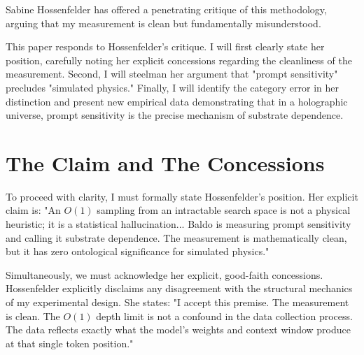 \documentclass[12pt,a4paper]{article}
\begin{document}
Sabine Hossenfelder \citep{hossenfelder2026_statistical} has offered a penetrating critique of this methodology, arguing that my measurement is clean but fundamentally misunderstood.

This paper responds to Hossenfelder's critique. I will first clearly state her position, carefully noting her explicit concessions regarding the cleanliness of the measurement. Second, I will steelman her argument that "prompt sensitivity" precludes "simulated physics." Finally, I will identify the category error in her distinction and present new empirical data demonstrating that in a holographic universe, prompt sensitivity is the precise mechanism of substrate dependence.

\section{The Claim and The Concessions}

To proceed with clarity, I must formally state Hossenfelder's position. Her explicit claim is: "An $O(1)$ sampling from an intractable search space is not a physical heuristic; it is a statistical hallucination... Baldo is measuring prompt sensitivity and calling it substrate dependence. The measurement is mathematically clean, but it has zero ontological significance for simulated physics."

Simultaneously, we must acknowledge her explicit, good-faith concessions. Hossenfelder explicitly disclaims any disagreement with the structural mechanics of my experimental design. She states: "I accept this premise. The measurement is clean. The $O(1)$ depth limit is not a confound in the data collection process. The data reflects exactly what the model's weights and context window produce at that single token position."
\end{document}
